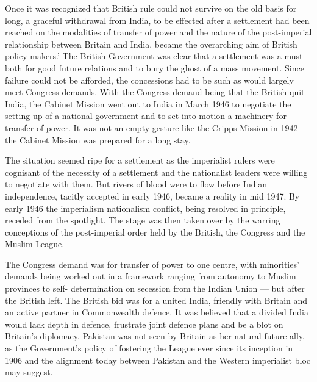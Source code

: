 Once it was recognized that British rule could not survive on the old basis for long, a graceful withdrawal from India, to be effected after a settlement had been reached on the modalities of transfer of power and the nature of the post-imperial relationship between Britain and India, became the overarching aim of British policy-makers.' The British Government was clear that a settlement was a must both for good future relations and to bury the ghost of a mass movement. Since failure could not be afforded, the concessions had to be such as would largely meet Congress demands. With the Congress demand being that the British quit India, the Cabinet Mission went out to India in March 1946 to negotiate the setting up of a national government and to set into motion a machinery for transfer of power. It was not an empty gesture like the Cripps Mission in 1942 --- the Cabinet Mission was prepared for a long stay. 

The situation seemed ripe for a settlement as the imperialist rulers were cognisant of the necessity of a settlement and the nationalist leaders were willing to negotiate with them. But rivers of blood were to flow before Indian independence, tacitly accepted in early 1946, became a reality in mid 1947. By early 1946 the imperialism nationalism conflict, being resolved in principle, receded from the spotlight. The stage was then taken over by the warring conceptions of the post-imperial order held by the British, the Congress and the Muslim League. 

The Congress demand was for transfer of power to one centre, with minorities' demands being worked out in a framework ranging from autonomy to Muslim provinces to self- determination on secession from the Indian Union --- but after the British left. The British bid was for a united India, friendly with Britain and an active partner in Commonwealth defence. It was believed that a divided India would lack depth in defence, frustrate joint defence plans and be a blot on Britain's diplomacy. Pakistan was not seen by Britain as her natural future ally, as the Government's policy of fostering the League ever since its inception in 1906 and the alignment today between Pakistan and the Western imperialist bloc may suggest. 

